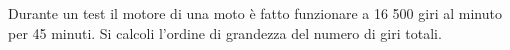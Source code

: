 Durante un test %
il motore di una moto 
è fatto funzionare a 16 500 giri al minuto per 45 minuti. 
Si calcoli l'ordine di grandezza del numero di giri totali.
